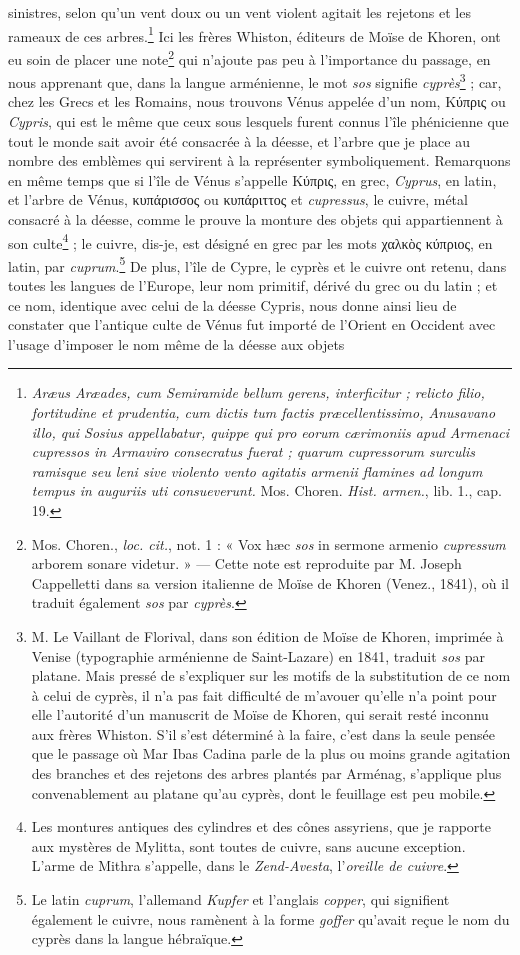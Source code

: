 \documentclass[a4paper, 11pt, oneside, polutonikogreek, french]{article}
\begin{document}
sinistres, selon qu'un vent doux ou un vent violent agitait les rejetons et les rameaux de ces arbres.\footnote{\emph{Aræus Aræades, cum Semiramide bellum gerens, interficitur ; relicto filio, fortitudine et prudentia, cum dictis tum factis præcellentissimo, Anusavano illo, qui Sosius appellabatur, quippe qui pro eorum cærimoniis apud Armenaci cupressos in Armaviro consecratus fuerat ; quarum cupressorum surculis ramisque seu leni sive violento vento agitatis armenii flamines ad longum tempus in auguriis uti consueverunt.} Mos. Choren. \emph{Hist. armen.}, lib. 1., cap. 19.} Ici les frères Whiston, éditeurs de Moïse de Khoren, ont eu soin de placer une note\footnote{Mos. Choren., \emph{loc. cit.}, not. 1 : « Vox hæc \emph{sos} in sermone armenio \emph{cupressum} arborem sonare videtur. » --- Cette note est reproduite par M. Joseph Cappelletti dans sa version italienne de Moïse de Khoren (Venez., 1841), où il traduit également \emph{sos} par \emph{cyprès}.} qui n'ajoute pas peu à l'importance du passage, en nous apprenant que, dans la langue arménienne, le mot \emph{sos} signifie \emph{cyprès}\footnote{M. Le Vaillant de Florival, dans son édition de Moïse de Khoren, imprimée à Venise (typographie arménienne de Saint-Lazare) en 1841, traduit \emph{sos} par platane. Mais pressé de s'expliquer sur les motifs de la substitution de ce nom à celui de cyprès, il n'a pas fait difficulté de m'avouer qu'elle n'a point pour elle l'autorité d'un manuscrit de Moïse de Khoren, qui serait resté inconnu aux frères Whiston. S'il s'est déterminé à la faire, c'est dans la seule pensée que le passage où Mar Ibas Cadina parle de la plus ou moins grande agitation des branches et des rejetons des arbres plantés par Arménag, s'applique plus convenablement au platane qu'au cyprès, dont le feuillage est peu mobile.} ; car, chez les Grecs et les Romains, nous trouvons Vénus appelée d'un nom, Κύπρις ou \emph{Cypris}, qui est le même que ceux sous lesquels furent connus l'île phénicienne que tout le monde sait avoir été consacrée à la déesse, et l'arbre que je place au nombre des emblèmes qui servirent à la représenter symboliquement. Remarquons en même temps que si l'île de Vénus s'appelle Κύπρις, en grec, \emph{Cyprus}, en latin, et l'arbre de Vénus, κυπάρισσος ou κυπάριττος et \emph{cupressus}, le cuivre, métal consacré à la déesse, comme le prouve la monture des objets qui appartiennent à son culte\footnote{Les montures antiques des cylindres et des cônes assyriens, que je rapporte aux mystères de Mylitta, sont toutes de cuivre, sans aucune exception. L'arme de Mithra s'appelle, dans le \emph{Zend-Avesta}, l'\emph{oreille de cuivre}.} ; le cuivre, dis-je, est désigné en grec par les mots χαλκὸς κύπριος, en latin, par \emph{cuprum}.\footnote{Le latin \emph{cuprum}, l'allemand \emph{Kupfer} et l'anglais \emph{copper}, qui signifient également le cuivre, nous ramènent à la forme \emph{goffer} qu'avait reçue le nom du cyprès dans la langue hébraïque.} De plus, l'île de Cypre, le cyprès et le cuivre ont retenu, dans toutes les langues de l'Europe, leur nom primitif, dérivé du grec ou du latin ; et ce nom, identique avec celui de la déesse Cypris, nous donne ainsi lieu de constater que l'antique culte de Vénus fut importé de l'Orient en Occident avec l'usage d'imposer le nom même de la déesse aux objets 
\end{document}
